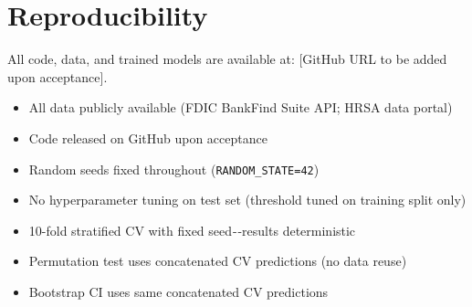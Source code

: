 \documentclass[conference]{IEEEtran}
\begin{document}
\section{Reproducibility}
All code, data, and trained models are available at:
[GitHub URL to be added upon acceptance].
\begin{itemize}
\item[$\checkmark$] All data publicly available (FDIC BankFind Suite API;
HRSA data portal)
\item[$\checkmark$] Code released on GitHub upon acceptance
\item[$\checkmark$] Random seeds fixed throughout (\texttt{RANDOM\_STATE=42})
\item[$\checkmark$] No hyperparameter tuning on test set (threshold
tuned on training split only)
\item[$\checkmark$] 10-fold stratified CV with fixed seed - -results
deterministic
\item[$\checkmark$] Permutation test uses concatenated CV predictions
(no data reuse)
\item[$\checkmark$] Bootstrap CI uses same concatenated CV predictions
\end{itemize}
\end{document}
